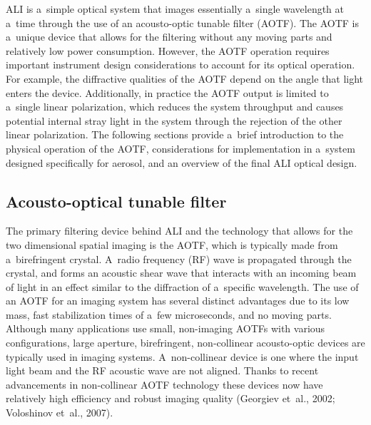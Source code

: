 \documentclass[amtd, online, hvmath]{copernicus}
\begin{document}
ALI is a~simple optical system that images essentially a~single
wavelength at a~time through the use of an acousto-optic tunable
filter (AOTF). The AOTF is a~unique device that allows for the
filtering without any moving parts and relatively low power
consumption. However, the AOTF operation requires important instrument
design considerations to account for its optical operation. For
example, the diffractive qualities of the AOTF depend on the angle
that light enters the device. Additionally, in practice the AOTF
output is limited to a~single linear polarization, which reduces the
system throughput and causes potential internal stray light in the
system through the rejection of the other linear polarization. The
following sections provide a~brief introduction to the physical
operation of the AOTF, considerations for implementation in a~system
designed specifically for aerosol, and an overview of the final ALI
optical design.

\subsection{Acousto-optical tunable filter}

The primary filtering device behind ALI and the technology that allows
for the two dimensional spatial imaging is the AOTF, which is
typically made from a~birefringent crystal. A~radio frequency (RF)
wave is propagated through the crystal, and forms an acoustic shear
wave that interacts with an incoming beam of light in an effect
similar to the diffraction of a~specific wavelength. The use of an
AOTF for an imaging system has several distinct advantages due to its
low mass, fast stabilization times of a~few microseconds, and no
moving parts. Although many applications use small, non-imaging AOTFs
with various configurations, large aperture, birefringent,
non-collinear acousto-optic devices are typically used in imaging
systems. A~non-collinear device is one where the input light beam and
the RF acoustic wave are not aligned. Thanks to recent advancements in
non-collinear AOTF technology these devices now have relatively high
efficiency and robust imaging quality (Georgiev et~al., 2002;
Voloshinov et~al., 2007).
\end{document}
